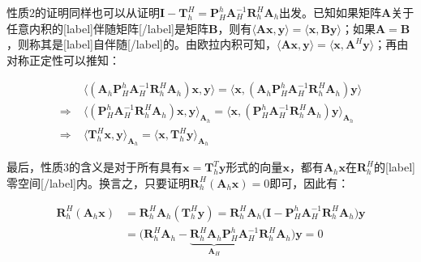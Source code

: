 \documentclass[12pt, UTF8, nofonts]{ctexart}
\begin{document}
性质$2$的证明同样也可以从证明$\boldsymbol{I}-\boldsymbol{T}_h^H=\boldsymbol{P}_H^h\boldsymbol{A}_H^{-1}\boldsymbol{R}_h^H\boldsymbol{A}_h$出发。已知如果矩阵$\boldsymbol{A}$关于任意内积的[label]伴随矩阵[/label]是矩阵$\boldsymbol{B}$，则有$\langle\boldsymbol{Ax},\boldsymbol{y}\rangle=\langle\boldsymbol{x},\boldsymbol{By}\rangle$；如果$\boldsymbol{A}=\boldsymbol{B}$，则称其是[label]自伴随[/label]的。由欧拉内积可知，$\langle\boldsymbol{Ax},\boldsymbol{y}\rangle=\langle\boldsymbol{x},\boldsymbol{A}^H\boldsymbol{y}\rangle$；再由对称正定性可以推知：

\[
  \begin{array}{rc}
    & \Big\langle(\boldsymbol{A}_h \boldsymbol{P}_H^h \boldsymbol{A}_H^{-1} \boldsymbol{R}_h^H\boldsymbol{A}_h)\boldsymbol{x},\boldsymbol{y}\Big\rangle = \Big\langle\boldsymbol{x}, (\boldsymbol{A}_h \boldsymbol{P}_H^h \boldsymbol{A}_H^{-1}\boldsymbol{R}_h^H\boldsymbol{A}_h)\boldsymbol{y}\Big\rangle \\
    \Rightarrow\;&
    \Big\langle(\boldsymbol{P}_H^h \boldsymbol{A}_H^{-1} \boldsymbol{R}_h^H\boldsymbol{A}_h)\boldsymbol{x},\boldsymbol{y}\Big\rangle_{\boldsymbol{A}_h} = \Big\langle\boldsymbol{x}, (\boldsymbol{P}_H^h \boldsymbol{A}_H^{-1}\boldsymbol{R}_h^H\boldsymbol{A}_h)\boldsymbol{y}\Big\rangle_{\boldsymbol{A}_h} \\
    \Rightarrow\;& \Big\langle\boldsymbol{T}_h^H\boldsymbol{x},\boldsymbol{y}\Big\rangle_{\boldsymbol{A}_h} = \Big\langle\boldsymbol{x},\boldsymbol{T}_h^H\boldsymbol{y}\Big\rangle_{\boldsymbol{A}_h}
  \end{array}
\]

最后，性质$3$的含义是对于所有具有$\boldsymbol{x}=\boldsymbol{T}_h^T\boldsymbol{y}$形式的向量$\boldsymbol{x}$，都有$\boldsymbol{A}_h\boldsymbol{x}$在$\boldsymbol{R}_h^H$的[label]零空间[/label]内。换言之，只要证明$\boldsymbol{R}_h^H(\boldsymbol{A}_h\boldsymbol{x})=0$即可，因此有：

\[
  \begin{aligned}
    \boldsymbol{R}_h^H(\boldsymbol{A}_h\boldsymbol{x}) &= \boldsymbol{R}_h^H\boldsymbol{A}_h(\boldsymbol{T}_h^H\boldsymbol{y}) = \boldsymbol{R}_h^H\boldsymbol{A}_h\Big(\boldsymbol{I} - \boldsymbol{P}_H^h\boldsymbol{A}_H^{-1}\boldsymbol{R}_h^H\boldsymbol{A}_h\Big)\boldsymbol{y} \\
    &= \Big(\boldsymbol{R}_h^H\boldsymbol{A}_h - \underbrace{\boldsymbol{R}_h^H\boldsymbol{A}_h\boldsymbol{P}_H^h}_{\boldsymbol{A}_H}\boldsymbol{A}_H^{-1}\boldsymbol{R}_h^H\boldsymbol{A}_h\Big)\boldsymbol{y} = 0
  \end{aligned}
\]

\end{document}
